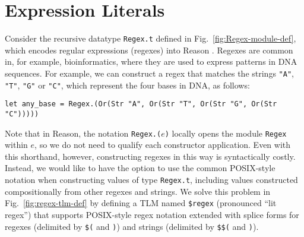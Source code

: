\documentclass[acmsmall,screen]{acmart}
\newcommand{\li}[1]{\lstinline[basicstyle=\ttfamily\fontsize{9pt}{1em}\selectfont]{#1}}
\begin{document}
\section{Expression Literals}
\label{sec:setlms}

Consider the recursive datatype \li{Regex.t} defined in Fig.~\ref{fig:Regex-module-def}, which encodes {regular expressions} (regexes) into Reason \cite{Thompson:1968:PTR:363347.363387}. Regexes are  common in, for example, bioinformatics, where they are used to express patterns in DNA sequences. For example, we can construct a regex that matches the strings \li{"A"}, \li{"T"}, \li{"G"} or \li{"C"}, which represent the four bases in DNA, as follows:
\begin{lstlisting}[numbers=none]
  let any_base = Regex.(Or(Str "A", Or(Str "T", Or(Str "G", Or(Str "C")))))
\end{lstlisting}
Note that in Reason, the notation \li{Regex.(}$e$\li{)} locally opens the module \li{Regex} within $e$, so we do not need to qualify each constructor application. Even with this shorthand, however, constructing regexes in this way is syntactically costly. Instead, we would like to have the option to use the common POSIX-style notation  \cite{STD95954} when constructing values of type \li{Regex.t}, including values constructed compositionally from other regexes and strings. 
We solve this problem in Fig.~\ref{fig:regex-tlm-def} by defining a TLM named \li{$regex} (pronounced ``lit regex'') that supports POSIX-style regex notation extended with splice forms for regexes (delimited by \li{$(} and \li{)}) and strings (delimited by \li{$$(} and \li{)}). 
\end{document}
